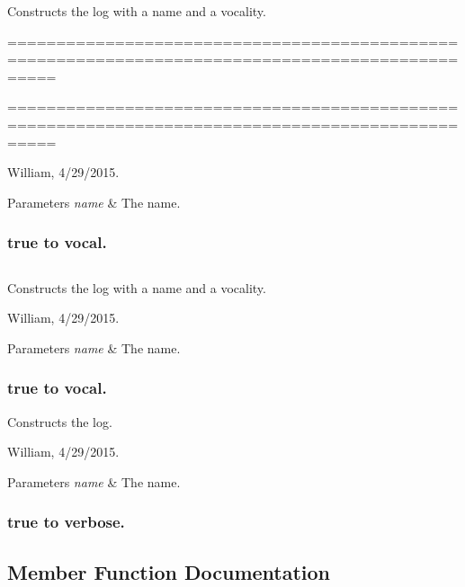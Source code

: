 Constructs the log with a name and a vocality. 

=================================================================================================

=================================================================================================

William, 4/29/2015. 


\begin{DoxyParams}{Parameters}
{\em name} & The name. \\
\hline
\end{DoxyParams}
\subsubsection*{true to vocal.  }

\subsection*{}

Constructs the log with a name and a vocality. 

William, 4/29/2015. 


\begin{DoxyParams}{Parameters}
{\em name} & The name. \\
\hline
\end{DoxyParams}
\subsubsection*{true to vocal.  }

Constructs the log. 

William, 4/29/2015. 


\begin{DoxyParams}{Parameters}
{\em name} & The name. \\
\hline
\end{DoxyParams}
\subsubsection*{true to verbose.  }

\subsection{Member Function Documentation}
\hypertarget{classfnn_1_1_log_a51541f4a7e78514fb6bd50864fc46a6a}{}
